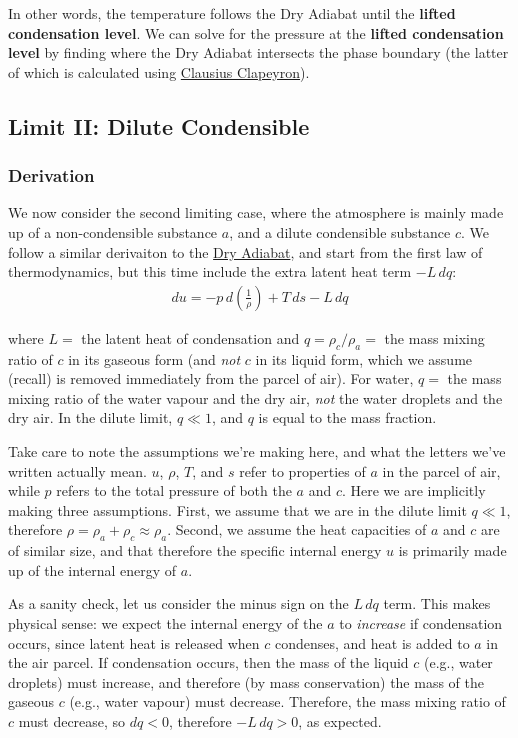 In other words, the temperature follows the Dry Adiabat until the \textbf{lifted condensation level}. We can solve for the pressure at the \textbf{lifted condensation level} by finding where the Dry Adiabat intersects the phase boundary (the latter of which is calculated using \hyperref[Clausius Clapeyron]{Clausius Clapeyron}).

\subsection{Limit II: Dilute Condensible}

\subsubsection{Derivation}

We now consider the second limiting case, where the atmosphere is mainly made up of a non-condensible substance \(a\), and a dilute condensible substance \(c\). We follow a similar derivaiton to the \hyperref[Dry Adiabat]{Dry Adiabat}, and start from the first law of thermodynamics, but this time include the extra latent heat term \(-L\,dq\):
\begin{align}\label{1st law latent heat}
    du=-p\,d\left(\frac{1}{\rho}\right)+T\,ds-L\,dq
\end{align}

\noindent where \(L=\) the latent heat of condensation and \(q=\rho_c/\rho_a=\) the mass mixing ratio of \(c\) in its gaseous form (and \textit{not} \(c\) in its liquid form, which we assume (recall) is removed immediately from the parcel of air). For water, \(q=\) the mass mixing ratio of the water vapour and the dry air, \textit{not} the water droplets and the dry air. In the dilute limit, \(q\ll 1\), and \(q\) is equal to the mass fraction. 

Take care to note the assumptions we're making here, and what the letters we've written actually mean. \(u\), \(\rho\), \(T\),  and \(s\) refer to properties of \(a\) in the parcel of air, while \(p\) refers to the total pressure of both the \(a\) and \(c\). Here we are implicitly making three assumptions. First, we assume that we are in the dilute limit \(q\ll 1\), therefore \(\rho=\rho_a+\rho_c\approx\rho_a\). Second, we assume the heat capacities of \(a\) and \(c\) are of similar size, and that therefore the specific internal energy \(u\) is primarily made up of the internal energy of \(a\).

As a sanity check, let us consider the minus sign on the \(L\,dq\) term. This makes physical sense: we expect the internal energy of the \(a\) to \textit{increase} if condensation occurs, since latent heat is released when \(c\) condenses, and heat is added to \(a\) in the air parcel. If condensation occurs, then the mass of the liquid \(c\) (e.g., water droplets) must increase, and therefore (by mass conservation) the mass of the gaseous \(c\) (e.g., water vapour) must decrease. Therefore, the mass mixing ratio of \(c\) must decrease, so \(dq<0\), therefore \(-L\,dq>0\), as expected.

